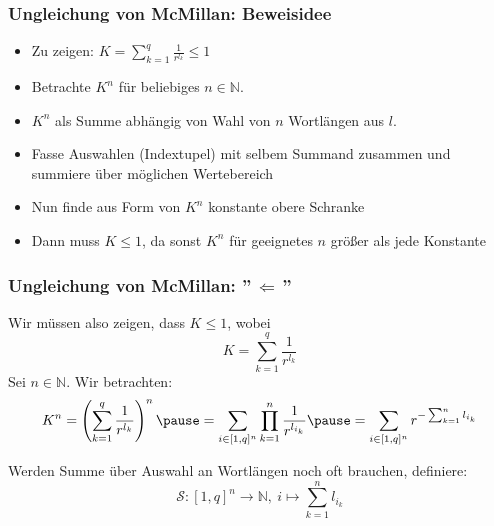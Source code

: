 \documentclass{beamer}
\begin{document}
\begin{frame}[t]
    \frametitle{Ungleichung von McMillan: Beweisidee}
    \begin{itemize}
        \setlength\itemsep{1em}
        \item Zu zeigen: $K = \sum_{k=1}^{q} \frac{1}{r^{l_k}} \leq 1$
        \pause
        \item Betrachte $K^n$ für beliebiges $n \in \mathbb{N}$.
        \pause
        \item $K^n$ als Summe abhängig von Wahl von $n$ Wortlängen aus $l$.
        \pause
        \item Fasse Auswahlen (Indextupel) mit selbem Summand zusammen
            und summiere über möglichen Wertebereich
        \pause
        \item Nun finde aus Form von $K^n$ konstante obere Schranke
        \pause
        \item Dann muss $K \leq 1$, da sonst $K^n$ für geeignetes $n$ größer
            als jede Konstante
    \end{itemize}
\end{frame}

\begin{frame}[t]
    \frametitle{Ungleichung von McMillan: ''$\,\Longleftarrow\,$''}
        Wir müssen also zeigen, dass $K \leq 1$, wobei
        $$
            K = \sum_{k=1}^{q} \frac{1}{r^{l_k}}
        $$
        \pause
        Sei $n \in \mathbb{N}$. Wir betrachten:
        $$
            K^n = \left(\sum_{k=1}^{q} \frac{1}{r^{l_k}}\right)^n
            \pause
            = \sum_{i \in [1,q]^n} \prod_{k=1}^{n} \frac{1}{r^{l_{i_k}}}
            \pause
            = \sum_{i\in [1,q]^n} r^{-\sum_{k=1}^{n} l_{i_k}}
        $$\pause

        Werden Summe über Auswahl an Wortlängen noch oft brauchen, definiere:
        $$
            \mathcal{S}: [1,q]^n \to \mathbb{N},\ i \mapsto \sum_{k=1}^{n} l_{i_k}
        $$
\end{frame}
\end{document}
